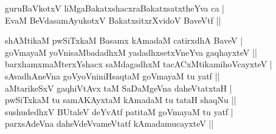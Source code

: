 \begin{entry}
\medskip
\begin{shl}
guruBaVkotxV liMgaBakatxshacxraBakatxsatxtheYva ca |\\
EvaM BeVdasamAyukotxV BakatxsitxrXvidoV BaveVtf ||
\end{shl}
\end{entry}

\begin{entry}
\medskip
\begin{shl}
shAMtikaM pwSiTxkaM Basamx kAmadaM catirxdhA BaveV |\\
goVmayaM yoVnisaMbadadhxM yadadhxsetxVneYva gaqhayxteV ||\\
barxhamxmaMterxYshacx saMdagadhxM tacACxMtikamihoVcayxteV |\\
sAvadhAneVna goVyoVniniHsaqtaM goVmayaM tu yatf ||\\
aMtarikeSxV gaqhiVtAvx taM SaDaMgeVna daheVtatxtaH |\\
pwSiTxkaM tu samAKAyxtaM kAmadaM tu tataH shaqNu ||\\
sushudedhxV BUtaleV deYvAtf patitaM goVmayaM tu yatf |\\
parxsAdeVna daheVdeVvameVtatf kAmadamucayxteV ||
\end{shl}
\medskip
{}
\end{entry}

